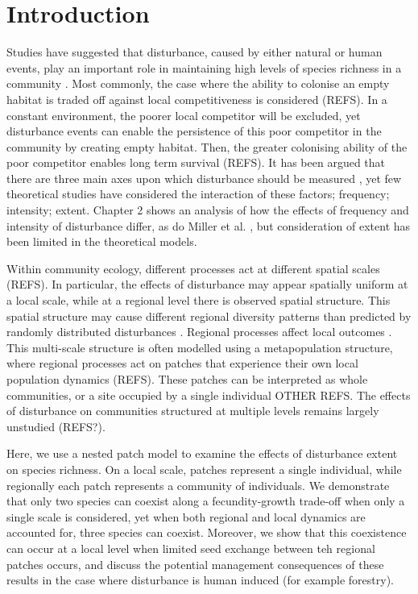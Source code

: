 
\section{Introduction}
Studies have suggested that disturbance, caused by either natural or human events, play an important role in maintaining high levels of species richness in a community \cite{connell1978diversity,huston1979general,sousa1984role,schoener1974resource}. Most commonly, the case where the ability to colonise an empty habitat is traded off against local competitiveness is considered (REFS). In a constant environment, the poorer local competitor will be excluded, yet disturbance events can enable the persistence of this poor competitor in the community by creating empty habitat. Then, the greater colonising ability of the poor competitor enables long term survival (REFS). It has been argued that there are three main axes upon which disturbance should be measured \cite{malanson1984intensity,miller1982community,sousa1984role}, yet few theoretical studies have considered the interaction of these factors; frequency; intensity; extent. Chapter 2 shows an analysis of how the effects of frequency and intensity of disturbance differ, as do Miller et al. \cite{miller2011frequency}, but consideration of extent has been limited in the theoretical models.

Within community ecology, different processes act at different spatial scales (REFS). In particular, the effects of disturbance may appear spatially uniform at a local scale, while at a regional level there is observed spatial structure. This spatial structure may cause different regional diversity patterns than predicted by randomly distributed disturbances \cite{vuilleumier2007patch}. Regional processes affect local outcomes \cite{holt1993ecology}. This multi-scale structure is often modelled using a metapopulation structure, where regional processes act on patches that experience their own local population dynamics (REFS). These patches can be interpreted as whole communities, or a site occupied by a single individual \cite{tilman1994competition,calcagno2006coexistence} OTHER REFS.  The effects of disturbance on communities structured at multiple levels remains largely unstudied (REFS?).

Here, we use a nested patch model to examine the effects of disturbance extent on species richness. On a local scale, patches represent a single individual, while regionally each patch represents a community of individuals. We demonstrate that only two species can coexist along a fecundity-growth trade-off when only a single scale is considered, yet when both regional and local dynamics are accounted for, three species can coexist. Moreover, we show that this coexistence can occur at a local level when limited seed exchange between teh regional patches occurs, and discuss the potential management consequences of these results in the case where disturbance is human induced (for example forestry).



